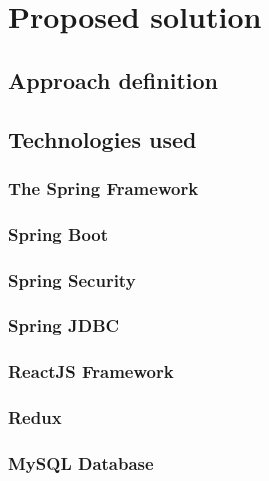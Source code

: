 \chapter{Proposed solution}
\label{chapter:proposedSolution}

\section{Approach definition}
\label{section:approachDefinition}


\section{Technologies used}
\label{section:technologiesUsed}


\subsection{The Spring Framework}
\label{subsection:springBootFramework}


\subsection{Spring Boot}
\label{subsection:springBoot}

\subsection{Spring Security}
\label{subsection:proposedSolution}

\subsection{Spring JDBC}
\label{subsection:springJDBC}

\subsection{ReactJS Framework}
\label{section:reactJSFramework}

\subsection{Redux}
\label{section:redux}

\subsection{MySQL Database}
\label{section:mysqlDatabase}


